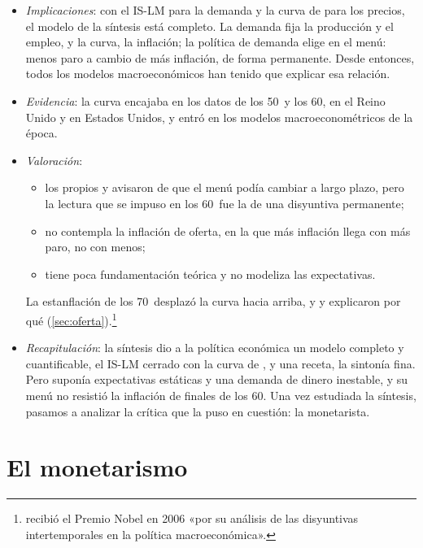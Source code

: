 \documentclass[11pt]{article}
\begin{document}
\begin{itemize}
\item \emph{Implicaciones}: con el IS-LM para la demanda y la curva de  para los precios, el modelo de la síntesis está completo. La demanda fija la producción y el empleo, y la curva, la inflación; la política de demanda elige en el menú: menos paro a cambio de más inflación, de forma permanente. Desde entonces, todos los modelos macroeconómicos han tenido que explicar esa relación.
\item \emph{Evidencia}: la curva encajaba en los datos de los 50~y los 60, en el Reino Unido y en Estados Unidos, y entró en los modelos macroeconométricos de la época.
\item \emph{Valoración}:
  \begin{itemize}
  \item los propios  y  avisaron de que el menú podía cambiar a largo plazo, pero la lectura que se impuso en los 60~fue la de una disyuntiva permanente;
  \item no contempla la inflación de oferta, en la que más inflación llega con más paro, no con menos;
  \item tiene poca fundamentación teórica y no modeliza las expectativas.
  \end{itemize}
  La estanflación de los 70~desplazó la curva hacia arriba, y  y  explicaron por qué (\ref{sec:oferta}).\footnote{ recibió el Premio Nobel en 2006 «por su análisis de las disyuntivas intertemporales en la política macroeconómica»\nocite{Nobel2006Phelps}.}
\end{itemize}

\begin{itemize}
\item \emph{Recapitulación}: la síntesis dio a la política económica un modelo completo y cuantificable, el IS-LM cerrado con la curva de , y una receta, la sintonía fina. Pero suponía expectativas estáticas y una demanda de dinero inestable, y su menú no resistió la inflación de finales de los 60. Una vez estudiada la síntesis, pasamos a analizar la crítica que la puso en cuestión: la monetarista.
\end{itemize}


\section{El monetarismo}\label{sec:monetarismo}
\end{document}
